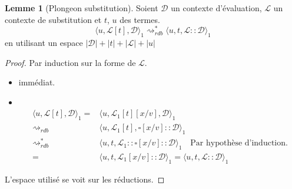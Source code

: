 \documentclass[11pt,a4paper]{article}
\theoremstyle{definition}
\newtheorem{lemma}[theorem]{Lemme}
\newcommand{\etatu}[1]{\langle #1 \rangle_1}
\newcommand{\mtd}{\mathcal{D}}
\newcommand{\mtl}{\mathcal{L}}
\begin{document}
\begin{lemma}[Plongeon substitution]
  \label{lemmaplouf2}
  Soient $\mathcal{D}$ un contexte d'évaluation, $\mtl$ un contexte de substitution et $t$, $u$ des termes.
  \[ \etatu{u, \mtl[t], \mtd} \rightsquigarrow_{rdb}^* \etatu{u, t, \mtl::\mtd} \]
en utilisant un espace $|\mtd|+|t|+|\mtl|+|u|$
\end{lemma}
\begin{proof}
  Par induction sur la forme de $\mathcal{L}$.
  \begin{itemize}
    \item {} immédiat.\\
    \item {}\\
  \begin{align*}
    \langle u, \mathcal{L}[t], \mathcal{D}\rangle_1 = &\langle u, \mathcal{L}_1[t][x/v], \mathcal{D}\rangle_1 \\
    \rightsquigarrow_{rdb} &\langle u, \mathcal{L}_1[t], \square[x/v]:: \mathcal{D}\rangle_1 \\
    \rightsquigarrow^*_{rdb} &\langle u, t, \mathcal{L}_1:: \square[x/v]:: \mathcal{D}\rangle_1 \quad \text{Par hypothèse d'induction.}\\
 = &\etatu{u, t, \mtl_1[x/v]::\mtd} = \etatu{u, t, \mtl::\mtd}
  \end{align*}
  \end{itemize}
  L'espace utilisé se voit sur les réductions.
\end{proof}
\end{document}
